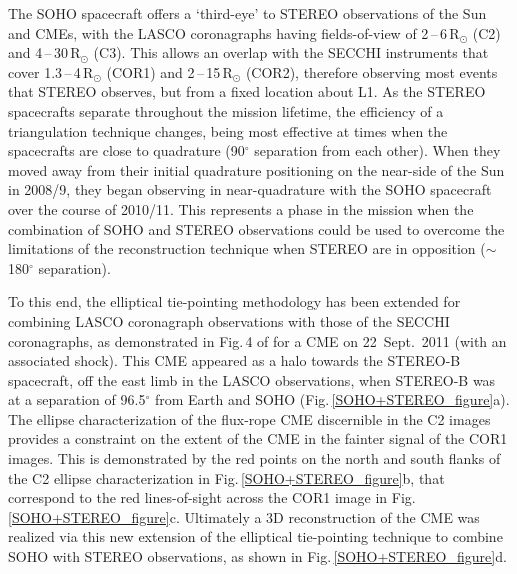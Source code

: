 \documentclass[preprint2]{aastex}
\begin{document}
The SOHO spacecraft offers a `third-eye' to STEREO observations of the Sun and CMEs, with the LASCO coronagraphs having fields-of-view of 2\,--\,6\,R$_{\odot}$ (C2) and 4\,--\,30\,R$_{\odot}$ (C3). This allows an overlap with the SECCHI instruments that cover 1.3\,--\,4\,R$_{\odot}$ (COR1) and 2\,--\,15\,R$_{\odot}$ (COR2), therefore observing most events that STEREO observes, but from a fixed location about L1. As the STEREO spacecrafts separate throughout the mission lifetime, the efficiency of a triangulation technique changes, being most effective at times when the spacecrafts are close to quadrature (90$^{\circ}$ separation from each other). When they moved away from their initial quadrature positioning on the near-side of the Sun in 2008/9, they began observing in near-quadrature with the SOHO spacecraft over the course of 2010/11. This represents a phase in the mission when the combination of SOHO and STEREO observations could be used to overcome the limitations of the reconstruction technique when STEREO are in opposition ($\sim$180$^{\circ}$ separation).

To this end, the elliptical tie-pointing methodology has been extended for combining LASCO coronagraph observations with those of the SECCHI coronagraphs, as demonstrated in Fig.\,4 of \citealt{2013NatPh...9..811C} for a CME on 22~Sept.~2011 (with an associated shock). This CME appeared as a halo towards the STEREO-B spacecraft, off the east limb in the LASCO observations, when STEREO-B was at a separation of 96.5$^{\circ}$ from Earth and SOHO (Fig.\,\ref{SOHO+STEREO_figure}a). The ellipse characterization of the flux-rope CME discernible in the C2 images provides a constraint on the extent of the CME in the fainter signal of the COR1 images. This is demonstrated by the red points on the north and south flanks of the C2 ellipse characterization in Fig.\,\ref{SOHO+STEREO_figure}b, that correspond to the red lines-of-sight across the COR1 image in Fig.\,\ref{SOHO+STEREO_figure}c. Ultimately a 3D reconstruction of the CME was realized via this new extension of the elliptical tie-pointing technique to combine SOHO with STEREO observations, as shown in Fig.\,\ref{SOHO+STEREO_figure}d.
\end{document}
